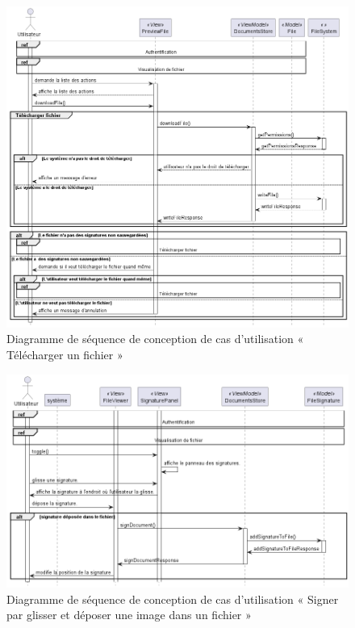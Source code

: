 \begin{figure}[H]
  \centering
  \includegraphics[width=1\textwidth]{out/diagrams/sprint4/sequence_download_file/sequence_download_file}
  \caption{Diagramme de séquence de conception de cas d'utilisation « Télécharger un fichier »}
  \label{fig:sequence_conception_download_file}
\end{figure}

\begin{figure}[H]
  \centering
  \includegraphics[width=1\textwidth]{out/diagrams/sprint4/sequence_sign_by_image/sequence_sign_by_image}
  \caption{Diagramme de séquence de conception de cas d'utilisation « Signer par glisser et déposer une image dans un fichier »}
  \label{fig:sequence_conception_sign_by_image}
\end{figure}

